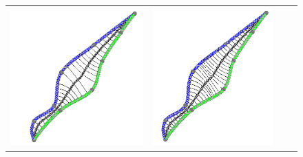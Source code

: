 \documentclass[journal, letterpaper]{IEEEtran}
\begin{document}
\begin{figure} %
	\centering
		\begin{tabular}{cccc}
			\includegraphics[scale=0.5]{images/NoGeodesicSampling.png} & \includegraphics[scale=0.5]{images/GeodesicSampling.png} 

\end{tabular}
\end{figure}
\end{document}
